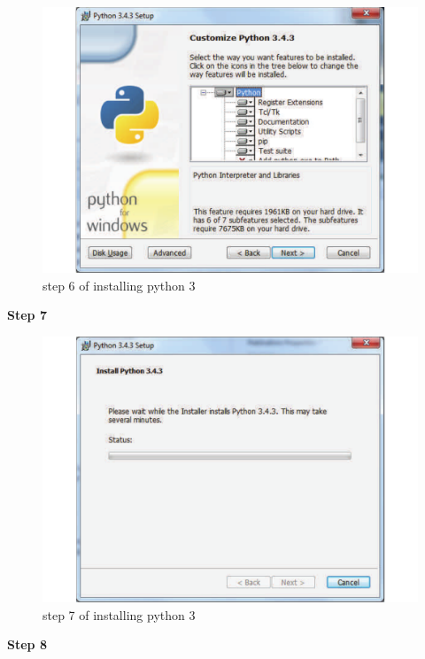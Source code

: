 \begin{figure}[H]
    \includegraphics[width=\textwidth]{./Manual/images/python6.pdf}
    \caption{step 6 of installing python 3} \label{fig:installing python3 6}
\end{figure}

\textbf{Step 7}

\begin{figure}[H]
    \includegraphics[width=\textwidth]{./Manual/images/python7.pdf}
    \caption{step 7 of installing python 3} \label{fig:installing python3 7}
\end{figure}

\textbf{Step 8}


